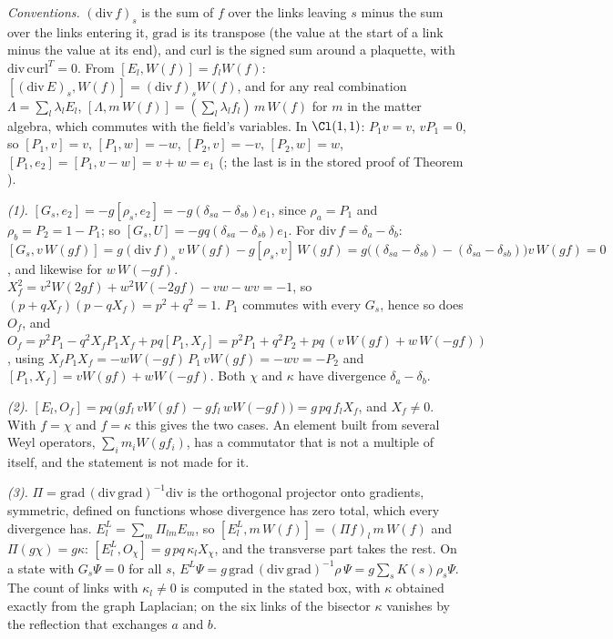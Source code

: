\emph{Conventions.} $(\mathrm{div}\,f)_{s}$ is the sum of $f$ over the links leaving $s$ minus the sum over the links entering it, $\mathrm{grad}$ is its transpose (the value at the start of a link minus the value at its end), and $\mathrm{curl}$ is the signed sum around a plaquette, with $\mathrm{div}\,\mathrm{curl}^{T} = 0$. From $[E_{l}, W(f)] = f_{l}W(f)$: $[(\mathrm{div}\,E)_{s}, W(f)] = (\mathrm{div}\,f)_{s}W(f)$, and for any real combination $\Lambda = \sum_{l}\lambda_{l}E_{l}$, $[\Lambda, m\,W(f)] = (\sum_{l}\lambda_{l}f_{l})\,m\,W(f)$ for $m$ in the matter algebra, which commutes with the field's variables. In $\Cl(1,1)$: $P_{1}v = v$, $vP_{1} = 0$, so $[P_{1}, v] = v$, $[P_{1}, w] = -w$, $[P_{2}, v] = -v$, $[P_{2}, w] = w$, $[P_{1}, e_{2}] = [P_{1}, v - w] = v + w = e_{1}$ (; the last is in the stored proof of Theorem ).

\emph{(1).} $[G_{s}, e_{2}] = -g[\rho_{s}, e_{2}] = -g(\delta_{sa} - \delta_{sb})e_{1}$, since $\rho_{a} = P_{1}$ and $\rho_{b} = P_{2} = 1 - P_{1}$; so $[G_{s}, U] = -gq(\delta_{sa} - \delta_{sb})e_{1}$. For $\mathrm{div}\,f = \delta_{a} - \delta_{b}$: $[G_{s}, v\,W(gf)] = g(\mathrm{div}\,f)_{s}\,v\,W(gf) - g[\rho_{s}, v]\,W(gf) = g\bigl((\delta_{sa} - \delta_{sb}) - (\delta_{sa} - \delta_{sb})\bigr)v\,W(gf) = 0$, and likewise for $w\,W(-gf)$. $X_{f}^{2} = v^{2}W(2gf) + w^{2}W(-2gf) - vw - wv = -1$, so $(p + qX_{f})(p - qX_{f}) = p^{2} + q^{2} = 1$. $P_{1}$ commutes with every $G_{s}$, hence so does $O_{f}$, and $O_{f} = p^{2}P_{1} - q^{2}X_{f}P_{1}X_{f} + pq[P_{1}, X_{f}] = p^{2}P_{1} + q^{2}P_{2} + pq\,(v\,W(gf) + w\,W(-gf))$, using $X_{f}P_{1}X_{f} = -wW(-gf)\,P_{1}\,vW(gf) = -wv = -P_{2}$ and $[P_{1}, X_{f}] = vW(gf) + wW(-gf)$. Both $\chi$ and $\kappa$ have divergence $\delta_{a} - \delta_{b}$.

\emph{(2).} $[E_{l}, O_{f}] = pq\,\bigl(gf_{l}\,vW(gf) - gf_{l}\,wW(-gf)\bigr) = g\,pq\,f_{l}X_{f}$, and $X_{f} \neq 0$. With $f = \chi$ and $f = \kappa$ this gives the two cases. An element built from several Weyl operators, $\sum_{i}m_{i}W(gf_{i})$, has a commutator that is not a multiple of itself, and the statement is not made for it.

\emph{(3).} $\Pi = \mathrm{grad}\,(\mathrm{div}\,\mathrm{grad})^{-1}\mathrm{div}$ is the orthogonal projector onto gradients, symmetric, defined on functions whose divergence has zero total, which every divergence has. $E^{L}_{l} = \sum_{m}\Pi_{lm}E_{m}$, so $[E^{L}_{l}, m\,W(f)] = (\Pi f)_{l}\,m\,W(f)$ and $\Pi(g\chi) = g\kappa$: $[E^{L}_{l}, O_{\chi}] = g\,pq\,\kappa_{l}X_{\chi}$, and the transverse part takes the rest. On a state with $G_{s}\Psi = 0$ for all $s$, $E^{L}\Psi = g\,\mathrm{grad}\,(\mathrm{div}\,\mathrm{grad})^{-1}\rho\,\Psi = g\sum_{s}K(s)\rho_{s}\Psi$. The count of links with $\kappa_{l} \neq 0$ is computed in the stated box, with $\kappa$ obtained exactly from the graph Laplacian; on the six links of the bisector $\kappa$ vanishes by the reflection that exchanges $a$ and $b$.

